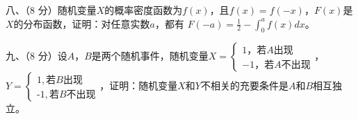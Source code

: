 \documentclass[fontset=exam]{exam-zh}
\begin{document}

八、（8 分）随机变量\(X\)的概率密度函数为\(f(x)\)，且\(f(x) = f( - x)\)，\(F(x)\)是\(X\)的分布函数，证明：对任意实数\(a\)，都有 \(F( - a) = \frac{1}{2} - {\int_{0}^{a}{f(x)dx}}\)。


九、（8 分）设\(A\)，\(B\)是两个随机事件，随机变量\(X = \left\{ \begin{array}{l}
{1\text{，若}A\text{出现}} \\
{- 1\text{，若}A\text{不出现}}
\end{array} \right.\)，\(Y = \left\{ \begin{array}{l}
{1,\text{若}B\text{出现}} \\
{\text{-}1,\text{若}B\text{不出现}}
\end{array} \right.\)，证明：随机变量\(X\)和\(Y\)不相关的充要条件是\(A\)和\(B\)相互独立。
\end{document}
